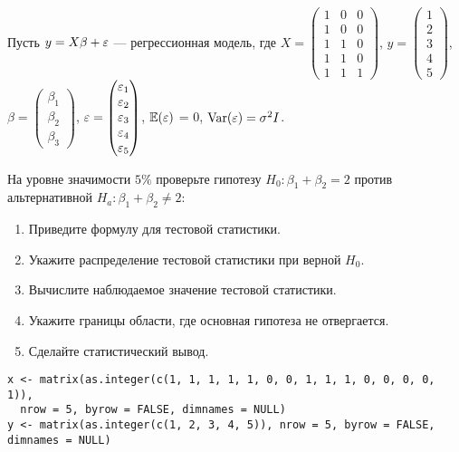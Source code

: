 \begin{problem}
Пусть $y = X\beta + \varepsilon$ — регрессионная модель, где $X = \begin{pmatrix} 1 & 0 & 0 \\ 1 & 0 & 0 \\ 1 & 1 & 0 \\ 1 & 1 & 0 \\ 1 & 1 & 1 \end{pmatrix}$, $y = \begin{pmatrix} 1 \\ 2 \\ 3 \\ 4 \\ 5 \end{pmatrix}$, $\beta = \begin{pmatrix} \beta_1 \\ \beta_2 \\ \beta_3 \end{pmatrix}$, $\varepsilon = \begin{pmatrix} \varepsilon_1 \\ \varepsilon_2 \\ \varepsilon_3 \\ \varepsilon_4 \\ \varepsilon_5  \end{pmatrix}$, $\mathbb{E}(\varepsilon)$ = 0, $\operatorname{Var}(\varepsilon) = \sigma^2 I$.

На уровне значимости $5\%$ проверьте гипотезу  $H_0: \beta_1 + \beta_2 = 2$ против альтернативной $H_a: \beta_1 + \beta_2 \not= 2$:
\begin{enumerate}
\item Приведите формулу для тестовой статистики.
\item Укажите распределение тестовой статистики  при верной $H_0$.
\item Вычислите наблюдаемое значение тестовой статистики.
\item Укажите границы области, где основная гипотеза не отвергается.
\item Сделайте статистический вывод.
\end{enumerate}


\begin{sol}

\begin{verbatim}
x <- matrix(as.integer(c(1, 1, 1, 1, 1, 0, 0, 1, 1, 1, 0, 0, 0, 0, 1)),
  nrow = 5, byrow = FALSE, dimnames = NULL)
y <- matrix(as.integer(c(1, 2, 3, 4, 5)), nrow = 5, byrow = FALSE, dimnames = NULL)
\end{verbatim}



\end{sol}
\end{problem}
